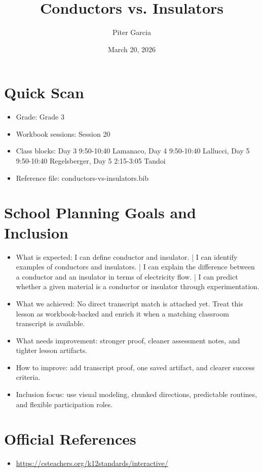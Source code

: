\documentclass[11pt]{article}
\title{Conductors vs. Insulators}
\author{Piter Garcia}
\date{March 20, 2026}
\begin{document}
\maketitle
\section*{Quick Scan}
\begin{itemize}[leftmargin=*]
\item Grade: Grade 3
\item Workbook sessions: Session 20
\item Class blocks: Day 3 9:50-10:40 Lamanaco, Day 4 9:50-10:40 Lallucci, Day 5 9:50-10:40 Regelsberger, Day 5 2:15-3:05 Tandoi
\item Reference file: conductors-vs-insulators.bib
\end{itemize}
\section*{School Planning Goals and Inclusion}
\begin{itemize}[leftmargin=*]
\item What is expected: I can define conductor and insulator. | I can identify examples of conductors and insulators. | I can explain the difference between a conductor and an insulator in terms of electricity flow. | I can predict whether a given material is a conductor or insulator through experimentation.
\item What we achieved: No direct transcript match is attached yet. Treat this lesson as workbook-backed and enrich it when a matching classroom transcript is available.
\item What needs improvement: stronger proof, cleaner assessment notes, and tighter lesson artifacts.
\item How to improve: add transcript proof, one saved artifact, and clearer success criteria.
\item Inclusion focus: use visual modeling, chunked directions, predictable routines, and flexible participation roles.
\end{itemize}
\section*{Official References}
\begin{itemize}[leftmargin=*]
\item \url{https://csteachers.org/k12standards/interactive/}

\end{itemize}
\end{document}

